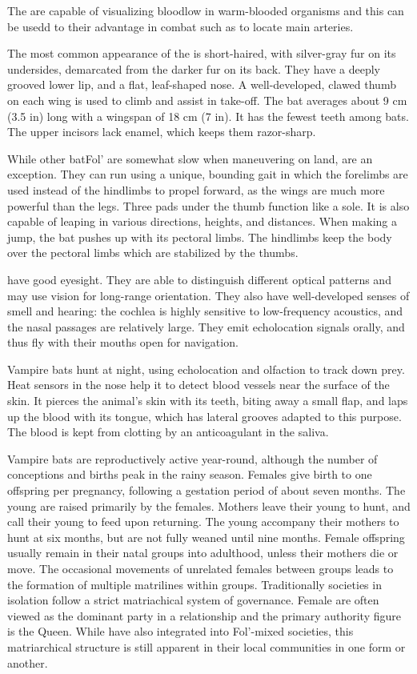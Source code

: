\documentclass[twoside, 12pt, letterpaper]{report}\usepackage[]{graphicx}\usepackage[]{color}
\begin{document}
\begin{multicols*}{2}
The \vmbat are capable of visualizing bloodlow in warm-blooded organisms and this can be usedd to their advantage in combat such as to locate main arteries.


The most common appearance of the \vmbat is short-haired, with silver-gray fur on its undersides, demarcated from the darker fur on its back. They have a deeply grooved lower lip, and a flat, leaf-shaped nose. A well-developed, clawed thumb on each wing is used to climb and assist in take-off. The bat averages about 9 cm (3.5 in) long with a wingspan of 18 cm (7 in). It has the fewest teeth among bats. The upper incisors lack enamel, which keeps them razor-sharp.

While other batFol' are somewhat slow when maneuvering on land, \vmbat are an exception. They can run using a unique, bounding gait in which the forelimbs are used instead of the hindlimbs to propel forward, as the wings are much more powerful than the legs. Three pads under the thumb function like a sole. It is also capable of leaping in various directions, heights, and distances. When making a jump, the bat pushes up with its pectoral limbs. The hindlimbs keep the body over the pectoral limbs which are stabilized by the thumbs.

\vmbat have good eyesight. They are able to distinguish different optical patterns and may use vision for long-range orientation. They also have well-developed senses of smell and hearing: the cochlea is highly sensitive to low-frequency acoustics, and the nasal passages are relatively large. They emit echolocation signals orally, and thus fly with their mouths open for navigation.


Vampire bats hunt at night, using echolocation and olfaction to track down prey. Heat sensors in the nose help it to detect blood vessels near the surface of the skin. It pierces the animal's skin with its teeth, biting away a small flap, and laps up the blood with its tongue, which has lateral grooves adapted to this purpose. The blood is kept from clotting by an anticoagulant in the saliva.

Vampire bats are reproductively active year-round, although the number of conceptions and births peak in the rainy season. Females give birth to one offspring per pregnancy, following a gestation period of about seven months. The young are raised primarily by the females. Mothers leave their young to hunt, and call their young to feed upon returning. The young accompany their mothers to hunt at six months, but are not fully weaned until nine months. Female offspring usually remain in their natal groups into adulthood, unless their mothers die or move. The occasional movements of unrelated females between groups leads to the formation of multiple matrilines within groups. Traditionally \vmbat societies in isolation follow a strict matriachical system of governance. Female \vmbat are often viewed as the dominant party in a relationship and the primary authority figure is the Queen. While \vmbat have also integrated into Fol'-mixed societies, this matriarchical structure is still apparent in their local communities in one form or another. 


\end{multicols*}
\end{document}

